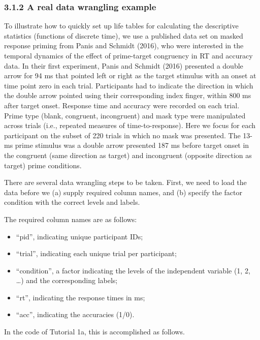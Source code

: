 \documentclass[
  man, donotrepeattitle,floatsintext]{apa6}
\providecommand{\tightlist}{%
  \setlength{\itemsep}{0pt}\setlength{\parskip}{0pt}}
\begin{document}
\subsubsection{3.1.2 A real data wrangling example}\label{a-real-data-wrangling-example}

To illustrate how to quickly set up life tables for calculating the descriptive statistics (functions of discrete time), we use a published data set on masked response priming from Panis and Schmidt (2016), who were interested in the temporal dynamics of the effect of prime-target congruency in RT and accuracy data.
In their first experiment, Panis and Schmidt (2016) presented a double arrow for 94 ms that pointed left or right as the target stimulus with an onset at time point zero in each trial. Participants had to indicate the direction in which the double arrow pointed using their corresponding index finger, within 800 ms after target onset. Response time and accuracy were recorded on each trial. Prime type (blank, congruent, incongruent) and mask type were manipulated across trials (i.e., repeated measures of time-to-response). Here we focus for each participant on the subset of 220 trials in which no mask was presented. The 13-ms prime stimulus was a double arrow presented 187 ms before target onset in the congruent (same direction as target) and incongruent (opposite direction as target) prime conditions.

There are several data wrangling steps to be taken. First, we need to load the data before we (a) supply required column names, and (b) specify the factor condition with the correct levels and labels.

The required column names are as follows:

\begin{itemize}
\tightlist
\item
  ``pid'', indicating unique participant IDs;
\item
  ``trial'', indicating each unique trial per participant;
\item
  ``condition'', a factor indicating the levels of the independent variable (1, 2, \ldots) and the corresponding labels;
\item
  ``rt'', indicating the response times in ms;
\item
  ``acc'', indicating the accuracies (1/0).
\end{itemize}

In the code of Tutorial 1a, this is accomplished as follows.

\footnotesize
\end{document}
